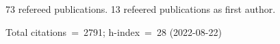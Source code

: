 73 refereed publications. 13 refeered publications as first author.

Total citations~=~2791; h-index~=~28 (2022-08-22)